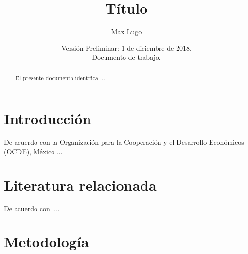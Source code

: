 \documentclass[11pt]{article}
\begin{document}



    
\title{\textbf{\huge Título}}
\author{Max Lugo}
\date{Versión Preliminar: 1 de diciembre de 2018. \\Documento de trabajo. \\ \textbf{} }
\maketitle

\begin{abstract}\label{abstract}
\noindent El presente documento identifica ...
\end{abstract}


\bigskip



\thispagestyle{empty}
\pagebreak \pagebreak

\newpage
\tableofcontents %
\setcounter{secnumdepth}{3} %
\setcounter{tocdepth}{4} %
\setcounter{page}{1}





\newpage

\section{Introducción}


\noindent De acuerdo con la Organización para la Cooperación y el Desarrollo Económicos (OCDE), México ...



\section{Literatura relacionada}

De acuerdo con \cite{Glewwe2008} ....



\section{Metodología}
\end{document}
